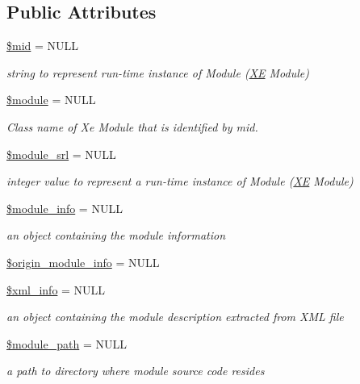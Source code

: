 \subsection*{Public Attributes}
\begin{DoxyCompactItemize}
\item 
\hyperlink{classModuleObject_abb68807f12d0fde6c9ea78a1a820d250}{\$mid} = N\+U\+LL
\begin{DoxyCompactList}\small\item\em string to represent run-\/time instance of Module (\hyperlink{namespaceXE}{XE} Module) \end{DoxyCompactList}\item 
\hyperlink{classModuleObject_a2809af79b38269089ba46bc922061ae8}{\$module} = N\+U\+LL
\begin{DoxyCompactList}\small\item\em Class name of Xe Module that is identified by mid. \end{DoxyCompactList}\item 
\hyperlink{classModuleObject_a0da50016ddc31513f563206fdf6f413d}{\$module\+\_\+srl} = N\+U\+LL
\begin{DoxyCompactList}\small\item\em integer value to represent a run-\/time instance of Module (\hyperlink{namespaceXE}{XE} Module) \end{DoxyCompactList}\item 
\hyperlink{classModuleObject_ac1c9807e77270f2e2abe4f79e1cd2987}{\$module\+\_\+info} = N\+U\+LL
\begin{DoxyCompactList}\small\item\em an object containing the module information \end{DoxyCompactList}\item 
\hyperlink{classModuleObject_a6bdf7982a5defc9d618c2dd1b700e876}{\$origin\+\_\+module\+\_\+info} = N\+U\+LL
\item 
\hyperlink{classModuleObject_aa0003698bcfe16bb25031435df251715}{\$xml\+\_\+info} = N\+U\+LL
\begin{DoxyCompactList}\small\item\em an object containing the module description extracted from X\+ML file \end{DoxyCompactList}\item 
\hyperlink{classModuleObject_aba24677d5cf457dc33d9af3d8a3b3a14}{\$module\+\_\+path} = N\+U\+LL
\begin{DoxyCompactList}\small\item\em a path to directory where module source code resides \end{DoxyCompactList}\item 

\end{DoxyCompactItemize}
